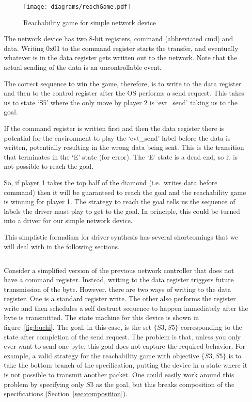 \begin{figure}
\centering
\texttt{[image: diagrams/reachGame.pdf]}
\caption{Reachability game for simple network device}
\label{fig:reach}
\end{figure}

The network device has two 8-bit registers, command (abbreviated cmd) and data. Writing 0x01 to the command register starts the transfer, and eventually whatever is in the data register gets written out to the network. Note that the actual sending of the data is an uncontrollable event. 

The correct sequence to win the game, therefore, is to write to the data register and then to the control register after the OS performs a send request. This takes us to state `S5' where the only move by player 2 is `evt\_send' taking us to the goal. 

If the command register is written first and then the data register there is potential for the environment to play the `evt\_send' label before the data is written, potentially resulting in the wrong data being sent. This is the transition that terminates in the `E' state (for error). The `E' state is a dead end, so it is not possible to reach the goal. 

So, if player 1 takes the top half of the diamond (i.e.\ writes data before command) then it will be guaranteed to reach the goal and the reachability game is winning for player 1. The strategy to reach the goal tells us the sequence of labels the driver must play to get to the goal. In principle, this could be turned into a driver for our simple network device.

This simplistic formalism for driver synthesis has several shortcomings that we will deal with in the following sections.

\subsection{\buchi}

Consider a simplified version of the previous network controller that does not have a command register. Instead, writing to the data register triggers future transmission of the byte. However, there are two ways of writing to the data register. One is a standard register write. The other also performs the register write and then schedules a self destruct sequence to happen immediately after the byte is transmitted. The state machine for this device is shown in figure~\ref{fig:buchi}. The goal, in this case, is the set $\{S3, S5\}$ corresponding to the state after completion of the send request. The problem is that, unless you only ever want to send one byte, this goal does not capture the required behavior. For example, a valid strategy for the reachability game with objective $\{S3, S5\}$ is to take the bottom branch of the specification, putting the device in a state where it is not possible to transmit another packet. One could easily work around this problem by specifying only ${S3}$ as the goal, but this breaks composition of the specifications (Section~\ref{sec:composition}).

